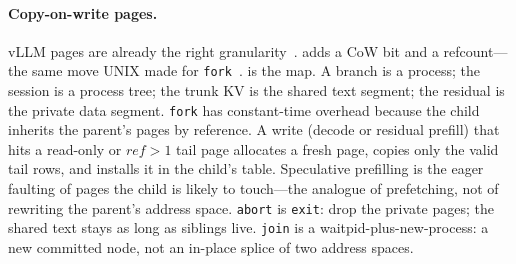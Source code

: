 \paragraph{Copy-on-write pages.}
vLLM pages are already the right granularity~\cite{vllm}.
\sys adds a CoW bit and a refcount---the same move UNIX made for \texttt{fork}~\cite{osfork,tanenbaumos}.
 is the map.
A branch is a process; the session is a process tree; the trunk KV is the shared text segment; the residual is the private data segment.
\texttt{fork} has constant-time overhead because the child inherits the parent's pages by reference.
A write (decode or residual prefill) that hits a read-only or $\mathit{ref}>1$ tail page allocates a fresh page, copies only the valid tail rows, and installs it in the child's table.
Speculative prefilling is the eager faulting of pages the child is likely to touch---the analogue of prefetching, not of rewriting the parent's address space.
\texttt{abort} is \texttt{exit}: drop the private pages; the shared text stays as long as siblings live.
\texttt{join} is a waitpid-plus-new-process: a new committed node, not an in-place splice of two address spaces.


